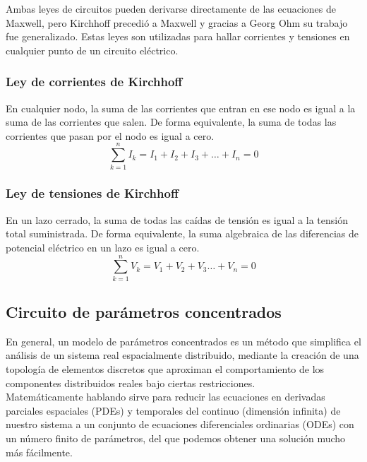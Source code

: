 \documentclass[]{article}
\begin{document}
Ambas leyes de circuitos pueden derivarse directamente de las ecuaciones de Maxwell, pero Kirchhoff precedió a Maxwell y gracias a Georg Ohm su trabajo fue generalizado. Estas leyes son utilizadas para hallar corrientes y tensiones en cualquier punto de un circuito eléctrico.\\

\subsubsection{Ley de corrientes de Kirchhoff}

En cualquier nodo, la suma de las corrientes que entran en ese nodo es igual a la suma de las corrientes que salen. De forma equivalente, la suma de todas las corrientes que pasan por el nodo es igual a cero.\\

\begin{equation}
   \sum_{k=1}^n I_k = I_1 + I_2 + I_3+\dots + I_n = 0 
\end{equation}


\subsubsection{Ley de tensiones de Kirchhoff}

En un lazo cerrado, la suma de todas las caídas de tensión es igual a la tensión total suministrada. De forma equivalente, la suma algebraica de las diferencias de potencial eléctrico en un lazo es igual a cero.\cite{LeyesKirchhoff}\\

\begin{equation}
\sum_{k=1}^n V_k = V_1 + V_2 + V_3\dots + V_n = 0
\end{equation}

\subsection{Circuito de parámetros concentrados}

En general, un modelo de parámetros concentrados es un método que simplifica el análisis de un sistema real espacialmente distribuido, mediante la creación de una topología de elementos discretos que aproximan el comportamiento de los componentes distribuidos reales bajo ciertas restricciones.\\

Matemáticamente hablando sirve para reducir las ecuaciones en derivadas parciales espaciales (PDEs) y temporales del continuo (dimensión infinita) de nuestro sistema a un conjunto de ecuaciones diferenciales ordinarias (ODEs) con un número finito de parámetros, del que podemos obtener una solución mucho más fácilmente.\\
\end{document}
